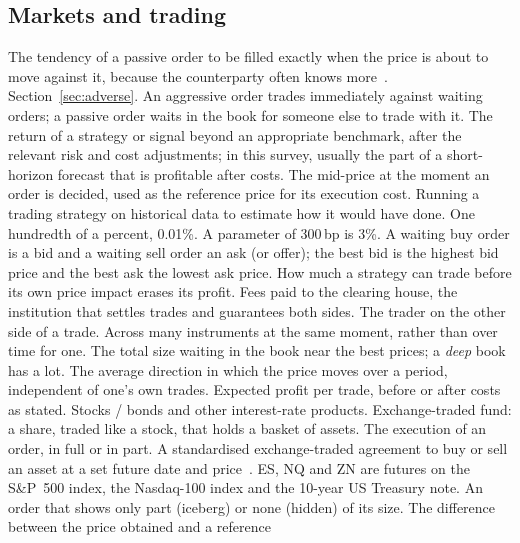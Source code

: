 \subsection{Markets and trading}
\begin{description}[leftmargin=1.2em,style=sameline,itemsep=1pt,font=\normalfont\bfseries]
 The tendency of a passive order to be filled exactly when the price is
  about to move against it, because the counterparty often knows more~\citep{glosten1985}.
  Section~\ref{sec:adverse}.
 An aggressive order trades immediately against waiting orders; a passive
  order waits in the book for someone else to trade with it.
 The return of a strategy or signal beyond an appropriate benchmark, after the relevant risk
  and cost adjustments; in this survey, usually the part of a short-horizon forecast that is profitable
  after costs.
 The mid-price at the moment an order is decided, used as the reference price for
  its execution cost.
 Running a trading strategy on historical data to estimate how it would have done.
 One hundredth of a percent, 0.01\%. A parameter of 300\,bp is 3\%.
 A waiting buy order is a bid and a waiting sell order an ask (or offer); the best
  bid is the highest bid price and the best ask the lowest ask price.
 How much a strategy can trade before its own price impact erases its profit.
 Fees paid to the clearing house, the institution that settles trades and
  guarantees both sides.
 The trader on the other side of a trade.
 Across many instruments at the same moment, rather than over time for one.
 The total size waiting in the book near the best prices; a \emph{deep} book has a lot.
 The average direction in which the price moves over a period, independent of one's
  own trades.
 Expected profit per trade, before or after costs as stated.
 Stocks / bonds and other interest-rate products.
 Exchange-traded fund: a share, traded like a stock, that holds a basket of assets.
 The execution of an order, in full or in part.
 A standardised exchange-traded agreement to buy or sell an asset at a set
  future date and price~\citep{hull}. ES, NQ and ZN are futures on the S\&P~500 index, the
  Nasdaq-100 index and the 10-year US Treasury note.
 An order that shows only part (iceberg) or none (hidden) of its size.
 The difference between the price obtained and a reference

\end{description}
